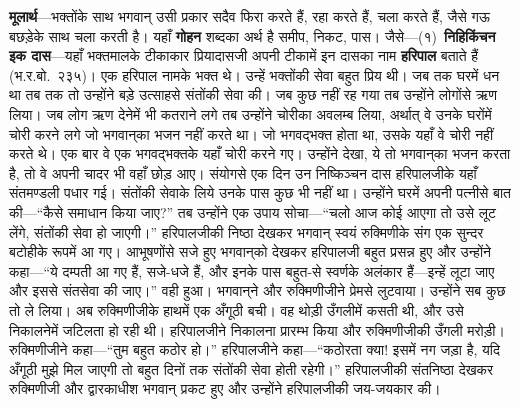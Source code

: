 \begin{sloppypar}\justifying{}
\textbf{मूलार्थ}—भक्तोंके साथ भगवान् उसी प्रकार सदैव फिरा करते हैं, रहा करते हैं, चला करते हैं, जैसे गऊ बछड़ेके साथ चला करती है। यहाँ \textbf{गोहन} शब्दका अर्थ है समीप, निकट, पास। जैसे—(१)~\textbf{निहिकिंचन इक दास}—यहाँ भक्तमालके टीकाकार प्रियादासजी अपनी टीकामें इन दासका नाम \textbf{हरिपाल} बताते हैं (भ.र.बो.~२३५)। एक हरिपाल नामके भक्त थे। उन्हें भक्तोंकी सेवा बहुत प्रिय थी। जब तक घरमें धन था तब तक तो उन्होंने बड़े उत्साहसे संतोंकी सेवा की। जब कुछ नहीं रह गया तब उन्होंने लोगोंसे ऋण लिया। जब लोग ऋण देनेमें भी कतराने लगे तब उन्होंने चोरीका अवलम्ब लिया, अर्थात् वे उनके घरोंमें चोरी करने लगे जो भगवान्‌का भजन नहीं करते था। जो भगवद्भक्त होता था, उसके यहाँ वे चोरी नहीं करते थे। एक बार वे एक भगवद्भक्तके यहाँ चोरी करने गए। उन्होंने देखा, ये तो भगवान्‌का भजन करता है, तो वे अपनी चादर भी वहाँ छोड़ आए। संयोगसे एक दिन उन निष्किञ्चन दास हरिपालजीके यहाँ संत\-मण्डली पधार गई। संतोंकी सेवाके लिये उनके पास कुछ भी नहीं था। उन्होंने घरमें अपनी पत्नीसे बात की—“कैसे समाधान किया जाए?” तब उन्होंने एक उपाय सोचा—“चलो आज कोई आएगा तो उसे लूट लेंगे, संतोंकी सेवा हो जाएगी।” हरिपालजीकी निष्ठा देखकर भगवान् स्वयं रुक्मिणीके संग एक सुन्दर बटोहीके रूपमें आ गए। आभूषणोंसे सजे हुए भगवान्‌को देखकर हरिपालजी बहुत प्रसन्न हुए और उन्होंने कहा—“ये दम्पती आ गए हैं, सजे-धजे हैं, और इनके पास बहुत-से स्वर्णके अलंकार हैं—इन्हें लूटा जाए और इससे संत\-सेवा की जाए।” वही हुआ। भगवान्‌ने और रुक्मिणीजीने प्रेमसे लुटवाया। उन्होंने सब कुछ तो ले लिया। अब रुक्मिणीजीके हाथमें एक अँगूठी बची। वह थोड़ी उँगलीमें कसती थी, और उसे निकालनेमें जटिलता हो रही थी। हरिपालजीने निकालना प्रारम्भ किया और रुक्मिणीजीकी उँगली मरोड़ी। रुक्मिणीजीने कहा—“तुम बहुत कठोर हो।” हरिपालजीने कहा—“कठोरता क्या! इसमें नग जड़ा है, यदि अँगूठी मुझे मिल जाएगी तो बहुत दिनों तक संतोंकी सेवा होती रहेगी।” हरिपालजीकी संतनिष्ठा देखकर रुक्मिणीजी और द्वारकाधीश भगवान् प्रकट हुए और उन्होंने हरिपालजीकी जय-जयकार की।
\end{sloppypar}
